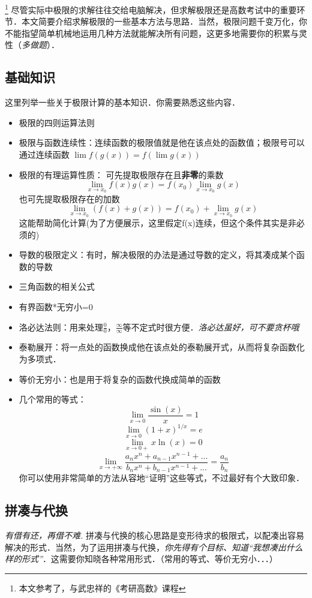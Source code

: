 
\begin{issues}
\issueDraft
\end{issues}
\footnote{本文参考了\cite{同济高}，\cite{Thomas}与武忠祥的《考研高数》课程}
尽管实际中极限的求解往往交给电脑解决，但求解极限还是高数考试中的重要环节．本文简要介绍求解极限的一些基本方法与思路．当然，极限问题千变万化，你不能指望简单机械地运用几种方法就能解决所有问题，这更多地需要你的积累与灵性（\textsl{多做题}）．

\subsection{基础知识}
这里列举一些关于极限计算的基本知识．你需要熟悉这些内容．
\begin{itemize}
\item 极限的四则运算法则
\item 极限与函数连续性：连续函数的极限值就是他在该点处的函数值；极限号可以通过连续函数 $\lim f(g(x)) = f(\lim g(x))$
\item 极限的有理运算性质：
可先提取极限存在且\textbf{非零}的乘数 
$$\lim_{x\to x_0} f(x)g(x) = f(x_0)\lim_{x\to x_0} g(x)$$
也可先提取极限存在的加数
$$\lim_{x\to x_0} (f(x)+g(x)) = f(x_0)+\lim_{x\to x_0} g(x)$$
这能帮助简化计算(为了方便展示，这里假定f(x)连续，但这个条件其实是非必须的)
\item 导数的极限定义：有时，解决极限的办法是通过导数的定义，将其凑成某个函数的导数
\item 三角函数的相关公式
\item 有界函数*无穷小=0
\item 洛必达法则：用来处理$\frac{0}{0}$，$\frac{\infty}{\infty}$等不定式时很方便．\textsl{洛必达虽好，可不要贪杯哦}
\item 泰勒展开：将一点处的函数换成他在该点处的泰勒展开式，从而将复杂函数化为多项式．
\item 等价无穷小：也是用于将复杂的函数代换成简单的函数
\item 几个常用的等式：
$$\lim_{x\to0} \frac{\sin(x)}{x}=1$$
$$\lim_{x\to0} (1+x)^{1/x}=e$$
$$\lim_{x\to0+} x\ln(x)=0$$
$$\lim_{x\to+\infty} \frac{a_nx^n+a_{n-1}x^{n-1}+...}{b_nx^n+b_{n-1}x^{n-1}+...}=\frac{a_n}{b_n}$$
你可以使用非常简单的方法从容地“证明”这些等式，不过最好有个大致印象．
\end{itemize}

\subsection{拼凑与代换}
\textsl{有借有还，再借不难.} 拼凑与代换的核心思路是变形待求的极限式，以配凑出容易解决的形式．当然，为了运用拼凑与代换，\textsl{你先得有个目标、知道“我想凑出什么样的形式”}．这需要你知晓各种常用形式．（常用的等式、等价无穷小．．．）

